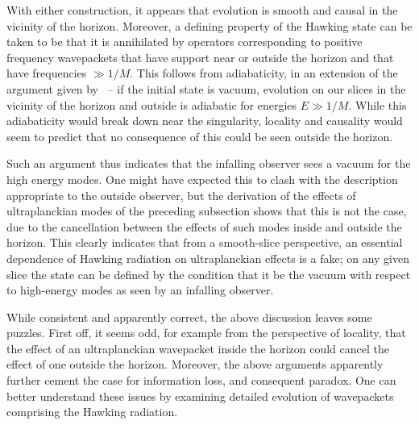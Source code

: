 With either construction, it appears that evolution is smooth and causal in the vicinity of the horizon.  Moreover,
a defining property of the Hawking state can be taken to be that it is annihilated by operators corresponding to positive frequency wavepackets that have support near or outside the horizon and that have frequencies $\gg 1/M$.  This follows from adiabaticity, in an extension of the argument given by \LPSTU\ -- if the initial state is vacuum, evolution on our slices in the vicinity of the horizon and outside is adiabatic for energies $E\gg 1/M$.  While this adiabaticity would break down near the singularity, locality and causality would seem to predict that no consequence of this could be seen outside the horizon.

Such an argument thus indicates that the infalling observer sees a vacuum for the high energy modes.  One might have expected this to clash with the description appropriate to the outside observer, but the derivation of the effects of ultraplanckian modes of the preceding subsection shows that this is not the case, due to the cancellation between the effects of such modes inside and outside the horizon.  This clearly indicates that from a smooth-slice perspective, an essential dependence of Hawking radiation on ultraplanckian effects  is a fake; on any given slice the state can be defined by the condition that it be the vacuum with respect to high-energy modes as seen by an infalling observer.


While consistent and apparently correct, the above discussion leaves some puzzles.  First off, it seems odd, for example from the perspective of locality, that the effect of an ultraplanckian wavepacket inside the horizon could cancel the effect of one outside the horizon.  Moreover, the above arguments apparently further cement the case for information loss, and consequent paradox.  One can better understand these issues by examining detailed evolution of  wavepackets comprising the Hawking radiation.

